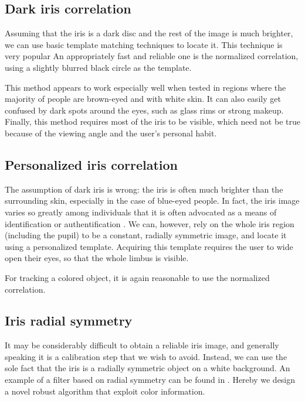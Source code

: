 \subsection{Dark iris correlation}

Assuming that the iris is a dark disc and the rest of the image is much brighter, we can use basic template matching techniques to locate it.
This technique is very popular \cite{zhu12,george16}
An appropriately fast and reliable one is the normalized correlation, using a slightly blurred black circle as the template.


This method appears to work especially well when tested in regions where the majority of people are brown-eyed and with white skin.
It can also easily get confused by dark spots around the eyes, such as glass rims or strong makeup.
Finally, this method requires most of the iris to be visible, which need not be true because of the viewing angle and the user's personal habit.

\subsection{Personalized iris correlation}
The assumption of dark iris is wrong: the iris is often much brighter than the surrounding skin, especially in the case of blue-eyed people.
In fact, the iris image varies so greatly among individuals that it is often advocated as a means of identification or authentification \cite{bowyer16}.
We can, however, rely on the whole iris region (including the pupil) to be a constant, radially symmetric image, and locate it using a personalized template.
Acquiring this template requires the user to wide open their eyes, so that the whole limbus is visible.

For tracking a colored object, it is again reasonable to use the normalized correlation.

\subsection{Iris radial symmetry}

It may be considerably difficult to obtain a reliable iris image, and generally speaking it is a calibration step that we wish to avoid.
Instead, we can use the sole fact that the iris is a radially symmetric object on a white background.
An example of a filter based on radial symmetry can be found in \cite{leo14}.
Hereby we design a novel robust algorithm that exploit color information.

